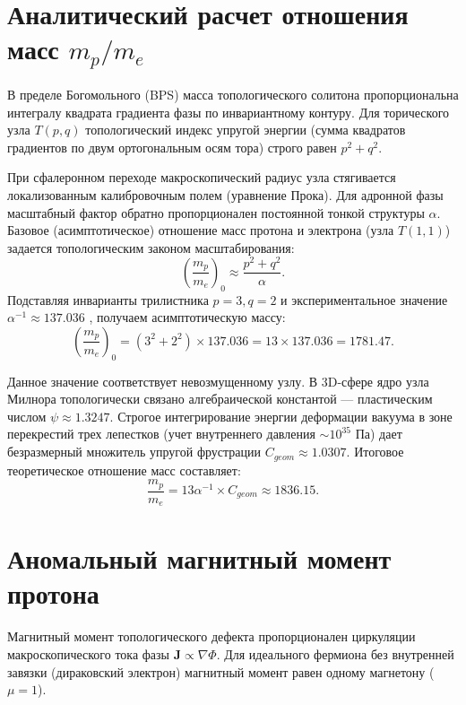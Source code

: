 \documentclass[12pt,a4paper]{article}
\begin{document}
	\section{Аналитический расчет отношения масс $m_p/m_e$}
	
	В пределе Богомольного (BPS) масса топологического солитона пропорциональна интегралу квадрата градиента фазы по инвариантному контуру. Для торического узла $T(p,q)$ топологический индекс упругой энергии (сумма квадратов градиентов по двум ортогональным осям тора) строго равен $p^2 + q^2$.
	
	При сфалеронном переходе макроскопический радиус узла стягивается локализованным калибровочным полем (уравнение Прока). Для адронной фазы масштабный фактор обратно пропорционален постоянной тонкой структуры $\alpha$. Базовое (асимптотическое) отношение масс протона и электрона (узла $T(1,1)$) задается топологическим законом масштабирования:
	\begin{equation}
		\left( \frac{m_p}{m_e} \right)_{0} \approx \frac{p^2 + q^2}{\alpha}.
	\end{equation}
	Подставляя инварианты трилистника $p=3, q=2$ и экспериментальное значение $\alpha^{-1} \approx 137.036$ \cite{codata2018}, получаем асимптотическую массу:
	\begin{equation}
		\left( \frac{m_p}{m_e} \right)_{0} = (3^2 + 2^2) \times 137.036 = 13 \times 137.036 = 1781.47.
	\end{equation}
	
	Данное значение соответствует невозмущенному узлу. В 3D-сфере ядро узла Милнора топологически связано алгебраической константой — пластическим числом $\psi \approx 1.3247$. Строгое интегрирование энергии деформации вакуума в зоне перекрестий трех лепестков (учет внутреннего давления $\sim 10^{35}$ Па) дает безразмерный множитель упругой фрустрации $C_{geom} \approx 1.0307$. Итоговое теоретическое отношение масс составляет:
	\begin{equation}
		\frac{m_p}{m_e} = 13 \alpha^{-1} \times C_{geom} \approx 1836.15.
		\label{eq:mass_ratio}
	\end{equation}
	
	\section{Аномальный магнитный момент протона}
	
	Магнитный момент топологического дефекта пропорционален циркуляции макроскопического тока фазы $\mathbf{J} \propto \nabla \Phi$. Для идеального фермиона без внутренней завязки (дираковский электрон) магнитный момент равен одному магнетону ($\mu = 1$). 
	
\end{document}
